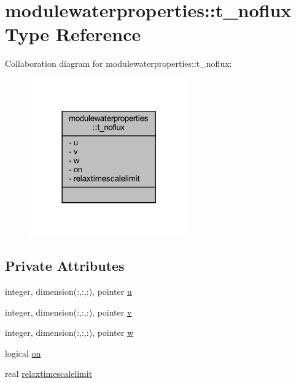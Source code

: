 \hypertarget{structmodulewaterproperties_1_1t__noflux}{}\section{modulewaterproperties\+:\+:t\+\_\+noflux Type Reference}
\label{structmodulewaterproperties_1_1t__noflux}


Collaboration diagram for modulewaterproperties\+:\+:t\+\_\+noflux\+:\nopagebreak
\begin{figure}[H]
\begin{center}
\leavevmode
\includegraphics[width=194pt]{structmodulewaterproperties_1_1t__noflux__coll__graph}
\end{center}
\end{figure}
\subsection*{Private Attributes}
\begin{DoxyCompactItemize}
\item 
integer, dimension(\+:,\+:,\+:), pointer \mbox{\hyperlink{structmodulewaterproperties_1_1t__noflux_a4aa4b7e32eb641e9beab20a7582edd8b}{u}}
\item 
integer, dimension(\+:,\+:,\+:), pointer \mbox{\hyperlink{structmodulewaterproperties_1_1t__noflux_a7c1e20f946683be36e8542e8c3335e9b}{v}}
\item 
integer, dimension(\+:,\+:,\+:), pointer \mbox{\hyperlink{structmodulewaterproperties_1_1t__noflux_a8eeea2c57fb82146e5ee502428c8fe16}{w}}
\item 
logical \mbox{\hyperlink{structmodulewaterproperties_1_1t__noflux_a316d197c973c5062bcafec16585acf42}{on}}
\item 
real \mbox{\hyperlink{structmodulewaterproperties_1_1t__noflux_ab0045650f1e78c9648a6e5b2add5fafb}{relaxtimescalelimit}}
\end{DoxyCompactItemize}


